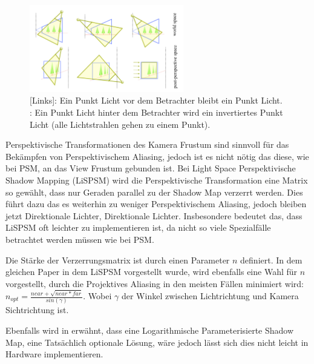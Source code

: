 \begin{figure}
	\begin{center}
    \includegraphics[width=0.6\textwidth]{res/img/psm_point_lights.png}
    \caption{[Links]: Ein Punkt Licht vor dem Betrachter bleibt ein Punkt Licht. \newline
      [Mitte]: Ein Punkt Licht hinter dem Betrachter wird ein
    invertiertes Punkt Licht (alle Lichtstrahlen gehen zu einem Punkt).}
	  \label{fig:psm-point-lights}
	\end{center}
\end{figure}
Perspektivische Transformationen des Kamera Frustum sind sinnvoll für das Bekämpfen von Perspektivischem Aliasing,
jedoch ist es nicht nötig das diese, wie bei PSM, an das View Frustum gebunden ist.
Bei Light Space Perspektivische Shadow Mapping (LiSPSM) \cite{LiPSM2004} wird die Perspektivische Transformation eine
Matrix so gewählt, dass nur Geraden parallel zu der Shadow Map verzerrt werden. 
Dies führt dazu das es weiterhin zu weniger Perspektivischem Aliasing, 
jedoch bleiben jetzt Direktionale Lichter, Direktionale Lichter.
Insbesondere bedeutet das, dass LiSPSM oft leichter zu implementieren ist, da nicht so viele Spezialfälle betrachtet werden müssen wie bei PSM.
\par
Die Stärke der Verzerrungsmatrix ist durch einen Parameter $n$ definiert.
In dem gleichen Paper in dem LiSPSM vorgestellt wurde, wird ebenfalls eine Wahl für $n$ vorgestellt,
durch die Projektives Aliasing in den meisten Fällen minimiert wird: $ n_{opt} = \frac{near + \sqrt{near * far}}{sin(\gamma)} $. Wobei $\gamma{}$ der Winkel zwischen Lichtrichtung und Kamera Sichtrichtung ist.
\par
Ebenfalls wird in \cite{LiPSM2004} erwähnt, dass eine Logarithmische Parameterisierte Shadow Map, eine Tatsächlich optionale Lösung, wäre
jedoch lässt sich dies nicht leicht in Hardware implementieren.
